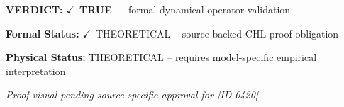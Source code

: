 \textbf{VERDICT:} \ensuremath{\checkmark}\ \textbf{TRUE} --- formal dynamical-operator validation

\textbf{Formal Status:} \ensuremath{\checkmark}\ THEORETICAL -- source-backed CHL proof obligation

\textbf{Physical Status:} THEORETICAL -- requires model-specific empirical interpretation
\par\vspace{0.45em}
\par
\vfill
\begingroup\footnotesize\itshape
Proof visual pending source-specific approval for [ID 0420].
\par\endgroup
\vfill
\endgroup
\endgroup
